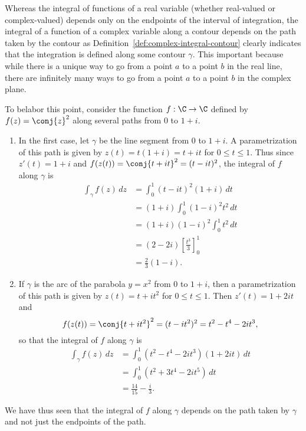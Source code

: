 \begin{example}
    \label{ex:complex-integral-contour-different-paths}
    Whereas the integral of functions of a real variable (whether real-valued or complex-valued) depends only on the endpoints of the interval of integration, the integral of a function of a complex variable along a contour depends on the path taken by the contour as Definition~\ref{def:complex-integral-contour} clearly indicates that the integration is defined along some contour \(\gamma\). This important because while there is a unique way to go from a point \(a\) to a point \(b\) in the real line, there are infinitely many ways to go from a point \(a\) to a point \(b\) in the complex plane.
    
    To belabor this point, consider the function \(f : \C \to \C\) defined by \(f(z) = \conj{z}^2\) along several paths from \(0\) to \(1 + i\). 
    \begin{enumerate}[label=(\alph*), wide, nosep]
        \item In the first case, let \(\gamma\) be the line segment from \(0\) to \(1 + i\). A parametrization of this path is given by \(z(t) = t(1 + i) = t + it\) for \(0 \leq t \leq 1\). Thus since \(z'(t) = 1 + i\) and \(f(z(t)) = \conj{t + it}^2 = (t - it)^2\), the integral of \(f\) along \(\gamma\) is
        \[
            \begin{aligned}
                \int_\gamma f(z) \, dz &= \int_0^1 (t - it)^2 (1 + i) \, dt \\
                &= (1 + i) \int_0^1 (1 - i)^2 t^2 \, dt \\
                &= (1 + i)(1 - i)^2 \int_0^1 t^2 \, dt \\
                &= (2 - 2i) \left[ \frac{t^3}{3} \right]_0^1 \\
                &= \frac{2}{3}(1 - i).
            \end{aligned}
        \]

        \item If \(\gamma\) is the arc of the parabola \(y = x^2\) from \(0\) to \(1 + i\), then a parametrization of this path is given by \(z(t) = t + it^2\) for \(0 \leq t \leq 1\). Then \(z'(t) = 1 + 2it\) and
        \[
            f(z(t)) = \conj{t + it^2}^2 = (t - it^2)^2 = t^2 - t^4 - 2it^3,
        \]
        so that the integral of \(f\) along \(\gamma\) is
        \[
            \begin{aligned}
                \int_\gamma f(z) \, dz &= \int_0^1 (t^2 - t^4 - 2it^3)(1 + 2it) \, dt \\
                &= \int_0^1 (t^2 + 3t^4 - 2it^5) \, dt \\
                &= \frac{14}{15} - \frac{i}{3}.
            \end{aligned}
        \]
    \end{enumerate}
    We have thus seen that the integral of \(f\) along \(\gamma\) depends on the path taken by \(\gamma\) and not just the endpoints of the path.
\end{example}

